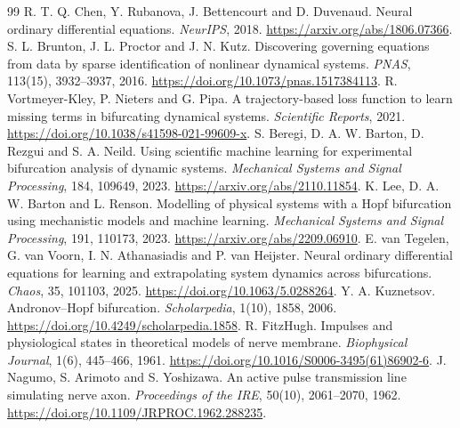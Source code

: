 \documentclass[11pt,a4paper]{article}
\begin{document}
\clearpage
\begin{thebibliography}{99}
 R. T. Q. Chen, Y. Rubanova, J. Bettencourt and D. Duvenaud. Neural ordinary differential equations. \emph{NeurIPS}, 2018. \url{https://arxiv.org/abs/1806.07366}.
 S. L. Brunton, J. L. Proctor and J. N. Kutz. Discovering governing equations from data by sparse identification of nonlinear dynamical systems. \emph{PNAS}, 113(15), 3932--3937, 2016. \url{https://doi.org/10.1073/pnas.1517384113}.
 R. Vortmeyer-Kley, P. Nieters and G. Pipa. A trajectory-based loss function to learn missing terms in bifurcating dynamical systems. \emph{Scientific Reports}, 2021. \url{https://doi.org/10.1038/s41598-021-99609-x}.
 S. Beregi, D. A. W. Barton, D. Rezgui and S. A. Neild. Using scientific machine learning for experimental bifurcation analysis of dynamic systems. \emph{Mechanical Systems and Signal Processing}, 184, 109649, 2023. \url{https://arxiv.org/abs/2110.11854}.
 K. Lee, D. A. W. Barton and L. Renson. Modelling of physical systems with a Hopf bifurcation using mechanistic models and machine learning. \emph{Mechanical Systems and Signal Processing}, 191, 110173, 2023. \url{https://arxiv.org/abs/2209.06910}.
 E. van Tegelen, G. van Voorn, I. N. Athanasiadis and P. van Heijster. Neural ordinary differential equations for learning and extrapolating system dynamics across bifurcations. \emph{Chaos}, 35, 101103, 2025. \url{https://doi.org/10.1063/5.0288264}.
 Y. A. Kuznetsov. Andronov--Hopf bifurcation. \emph{Scholarpedia}, 1(10), 1858, 2006. \url{https://doi.org/10.4249/scholarpedia.1858}.
 R. FitzHugh. Impulses and physiological states in theoretical models of nerve membrane. \emph{Biophysical Journal}, 1(6), 445--466, 1961. \url{https://doi.org/10.1016/S0006-3495(61)86902-6}.
 J. Nagumo, S. Arimoto and S. Yoshizawa. An active pulse transmission line simulating nerve axon. \emph{Proceedings of the IRE}, 50(10), 2061--2070, 1962. \url{https://doi.org/10.1109/JRPROC.1962.288235}.
\end{thebibliography}
\end{document}
